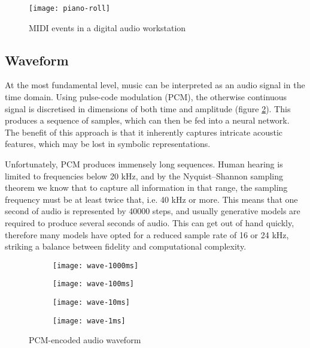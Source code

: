 \documentclass[../../report.tex]{subfiles}
\begin{document}
\begin{figure}
  \centering
  \texttt{[image: piano-roll]}
  \caption{MIDI events in a digital audio workstation}
  \label{fig:piano-roll}
\end{figure}

\subsection{Waveform}

At the most fundamental level, music can be interpreted as an audio signal in
the time domain. Using pulse-code modulation (PCM), the otherwise continuous
signal is discretised in dimensions of both time and amplitude (figure
\ref{fig:pcm}). This produces a sequence of samples, which can then be fed into
a neural network. The benefit of this approach is that it inherently captures
intricate acoustic features, which may be lost in symbolic representations.
\cite{Dieleman2020}

Unfortunately, PCM produces immensely long sequences. Human hearing is limited
to frequencies below \num{20} kHz, and by the Nyquist--Shannon sampling theorem
we know that to capture all information in that range, the sampling frequency
must be at least twice that, i.e. \num{40} kHz or more. This means that one
second of audio is represented by \num{40000} steps, and usually generative
models are required to produce several seconds of audio. This can get out of
hand quickly, therefore many models have opted for a reduced sample rate of
\num{16} or \num{24} kHz, striking a balance between fidelity and computational
complexity. \cite{Dieleman2020}

\begin{figure}
  \centering
  \begin{subfigure}[b]{0.24\textwidth}
    \texttt{[image: wave-1000ms]}
  \end{subfigure}
  \hfill
  \begin{subfigure}[b]{0.24\textwidth}
    \texttt{[image: wave-100ms]}
  \end{subfigure}
  \hfill
  \begin{subfigure}[b]{0.24\textwidth}
    \texttt{[image: wave-10ms]}
  \end{subfigure}
  \hfill
  \begin{subfigure}[b]{0.24\textwidth}
    \texttt{[image: wave-1ms]}
  \end{subfigure}
  \caption{PCM-encoded audio waveform \cite{Oord2016}}
  \label{fig:pcm}
\end{figure}
\end{document}
